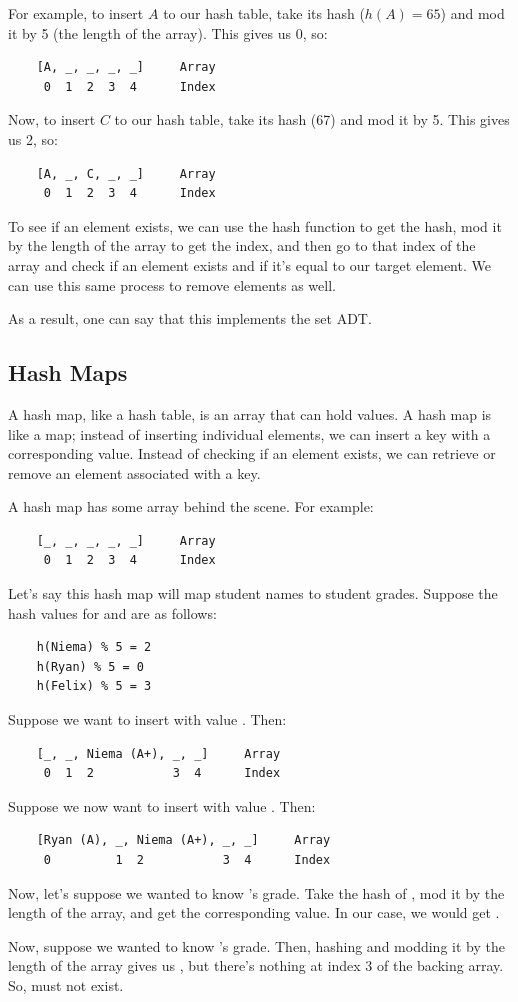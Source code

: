 \documentclass[letterpaper]{article}
\begin{document}
\bigskip 

For example, to insert $A$ to our hash table, take its hash ($h(A) = 65$) and mod it by 5 (the length of the array). This gives us 0, so: 
\begin{verbatim}
    [A, _, _, _, _]     Array 
     0  1  2  3  4      Index 
\end{verbatim}
Now, to insert $C$ to our hash table, take its hash (67) and mod it by 5. This gives us 2, so:
\begin{verbatim}
    [A, _, C, _, _]     Array 
     0  1  2  3  4      Index 
\end{verbatim}

To see if an element exists, we can use the hash function to get the hash, mod it by the length of the array to get the index, and then go to that index of the array and check if an element exists and if it's equal to our target element. We can use this same process to remove elements as well.

\bigskip

As a result, one can say that this implements the set ADT. 

\subsection{Hash Maps}
A hash map, like a hash table, is an array that can hold values. A hash map is like a map; instead of inserting individual elements, we can insert a key with a corresponding value. Instead of checking if an element exists, we can retrieve or remove an element associated with a key. 

\bigskip

A hash map has some array behind the scene. For example: 
\begin{verbatim}
    [_, _, _, _, _]     Array 
     0  1  2  3  4      Index 
\end{verbatim}
Let's say this hash map will map student names to student grades. Suppose the hash values for  and  are as follows: 
\begin{verbatim}
    h(Niema) % 5 = 2
    h(Ryan) % 5 = 0
    h(Felix) % 5 = 3
\end{verbatim}

Suppose we want to insert  with value . Then: 
\begin{verbatim}
    [_, _, Niema (A+), _, _]     Array 
     0  1  2           3  4      Index 
\end{verbatim}
Suppose we now want to insert  with value . Then: 
\begin{verbatim}
    [Ryan (A), _, Niema (A+), _, _]     Array 
     0         1  2           3  4      Index 
\end{verbatim}

Now, let's suppose we wanted to know 's grade. Take the hash of , mod it by the length of the array, and get the corresponding value. In our case, we would get . 

\bigskip

Now, suppose we wanted to know 's grade. Then, hashing  and modding it by the length of the array gives us , but there's nothing at index 3 of the backing array. So,  must not exist. 
\end{document}
